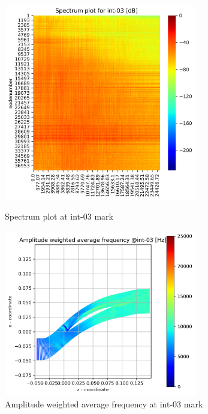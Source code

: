 \begin{figure}[ht]
  \centering
  \includegraphics[width=0.75\textwidth]{Figures/int-03_spectrum.png}
  \caption{Spectrum plot at int-03 mark} \label{int-03-spectrum}
  
  \vspace*{\floatsep}%

  \includegraphics[width=0.75\textwidth]{Figures/int-03-awaf.png}
  \caption{Amplitude weighted average frequency at int-03 mark} \label{int-03-awaf}
\end{figure}

